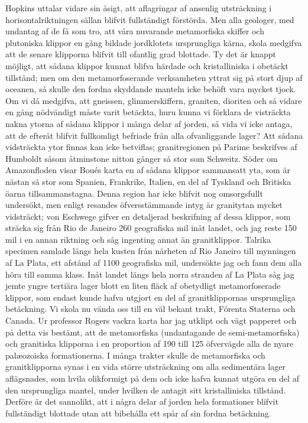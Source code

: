 Hopkins uttalar vidare sin åsigt, att aflagringar af ansenlig utsträckning i horisontalriktningen sällan blifvit fullständigt förstörda. Men alla geologer, med undantag af de få som tro, att våra nuvarande metamorfiska skiffer och plutoniska klippor en gång bildade jordklotets ursprungliga kärna, skola medgifva att de senare klipporna blifvit till ofantlig grad blottade. Ty det är knappt möjligt, att sådana klippor kunnat blifva härdade och kristalliniska i obetäckt tillstånd; men om den metamorfoserande verksamheten yttrat sig på stort djup af oceanen, så skulle den fordna skyddande manteln icke behöft vara mycket tjock. Om vi då medgifva, att gneissen, glimmerskiffern, graniten, dioriten och så vidare en gång nödvändigt måste varit betäckta, huru kunna vi förklara de visträckta nakna ytorna af sådana klippor i många delar af jorden, så vida vi icke antaga, att de efteråt blifvit fullkomligt befriade från alla ofvanliggande lager? Att sådana vidsträckta ytor finnas kan icke betviflas; granitregionen på Parime beskrifves af Humboldt såsom åtminstone nitton gånger så stor som Schweitz. Söder om Amazonfloden visar Boués karta en af sådana klippor sammansatt yta, som är nästan så stor som Spanien, Frankrike, Italien, en del af Tyskland och Britiska öarna tillsammanstagna. Denna region har icke blifvit nog omsorgsfullt undersökt, men enligt resandes öfversstämmande intyg är granitytan mycket vidsträckt; von Eschwege gifver en detaljerad beskrifning af dessa klippor, som sträcka sig från Rio de Janeiro 260 geografiska mil inåt landet, och jag reste 150 mil i en annan riktning och såg ingenting annat än granitklippor. Talrika specimen samlade längs hela kusten från närheten af Rio Janeiro till mynningen af La Plata, ett afstånd af 1100 geografiska mil, undersökte jag och fann dem alla höra till samma klass. Inåt landet längs hela norra stranden af La Plata såg jag jemte yngre tertiära lager blott en liten fläck af obetydligt metamorfoserade klippor, som endast kunde hafva utgjort en del af granitklippornas ursprungliga betäckning. Vi skola nu vända oss till en väl bekant trakt, Förenta Staterna och Canada. Ur professor Rogers vackra karta har jag utklipt och vägt papperet och på detta vis bestämt, att de metamorfiska (undantagande de semi-metamorfiska) och granitiska klipporna i en proportion af 190 till 125 öfvervägde alla de nyare palæozoiska formationerna. I många trakter skulle de metamorfiska och granitklipporna synas i en vida större utsträckning om alla sedimentära lager aflägsnades, som hvila olikformigt på dem och icke hafva kunnat utgöra en del af den ursprungliga mantel, under hvilken de antagit sitt kristalliniska tillstånd. Derföre är det sannolikt, att i några delar af jorden hela formationer blifvit fullständigt blottade utan att bibehålla ett spår af sin fordna betäckning.

